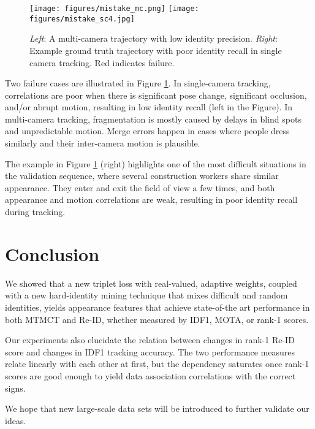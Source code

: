 \documentclass[10pt,twocolumn,letterpaper]{article}
\begin{document}
\begin{figure}[t]
\centering
\texttt{[image: figures/mistake\_mc.png]} 
\texttt{[image: figures/mistake\_sc4.jpg]}
\caption{\emph{Left}: A multi-camera trajectory with low identity precision. \emph{Right}: Example ground truth trajectory with poor identity recall in single camera tracking. Red indicates failure.}
\label{fig:mistake_sc}
\end{figure}


Two failure cases are illustrated in Figure \ref{fig:mistake_sc}. In single-camera tracking, correlations are poor when there is significant pose change, significant occlusion, and/or abrupt motion, resulting in low identity recall (left in the Figure). In multi-camera tracking, fragmentation is mostly caused by delays in blind spots and unpredictable motion. Merge errors happen in cases where people dress similarly and their inter-camera motion is plausible. 

The example in Figure \ref{fig:mistake_sc} (right) highlights one of the most difficult situations in the validation sequence, where several construction workers share similar appearance. They enter and exit the field of view a few times, and both appearance and motion correlations are weak, resulting in poor identity recall during tracking.





\section{Conclusion}



We showed that a new triplet loss with real-valued, adaptive weights, coupled with a new hard-identity mining technique that mixes difficult and random identities, yields appearance features that achieve state-of-the art performance in both MTMCT and Re-ID, whether measured by IDF1, MOTA, or rank-1 scores.

Our experiments also elucidate the relation between changes in rank-1 Re-ID score and changes in IDF1 tracking accuracy. The two performance measures relate linearly with each other at first, but the dependency saturates once rank-1 scores are good enough to yield data association correlations with the correct signs.

We hope that new large-scale data sets will be introduced to further validate our ideas.


{\small


}
\end{document}
